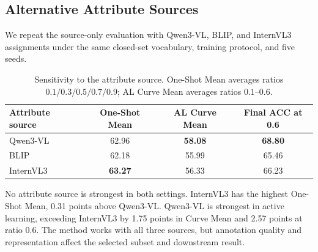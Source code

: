 \subsection{Alternative Attribute Sources}

We repeat the source-only evaluation with Qwen3-VL, BLIP, and InternVL3 assignments under the same closed-set vocabulary, training protocol, and five seeds.

\begin{table}[t]
\centering
\caption{Sensitivity to the attribute source. One-Shot Mean averages ratios $0.1/0.3/0.5/0.7/0.9$; AL Curve Mean averages ratios $0.1$--$0.6$.}
\label{tab:attribute-source-ablation}
\small
\setlength{\tabcolsep}{6pt}
\begin{tabular}{l c c c}
\toprule
\rowcolor{sectiongray} \textbf{Attribute source} & \textbf{One-Shot Mean} & \textbf{AL Curve Mean} & \textbf{Final ACC at 0.6} \\
\midrule
Qwen3-VL & 62.96 & \textbf{58.08} & \textbf{68.80} \\
BLIP & 62.18 & 55.99 & 65.46 \\
InternVL3 & \textbf{63.27} & 56.33 & 66.23 \\
\bottomrule
\end{tabular}
\end{table}

No attribute source is strongest in both settings. InternVL3 has the highest One-Shot Mean, 0.31 points above Qwen3-VL. Qwen3-VL is strongest in active learning, exceeding InternVL3 by 1.75 points in Curve Mean and 2.57 points at ratio $0.6$. The method works with all three sources, but annotation quality and representation affect the selected subset and downstream result.
